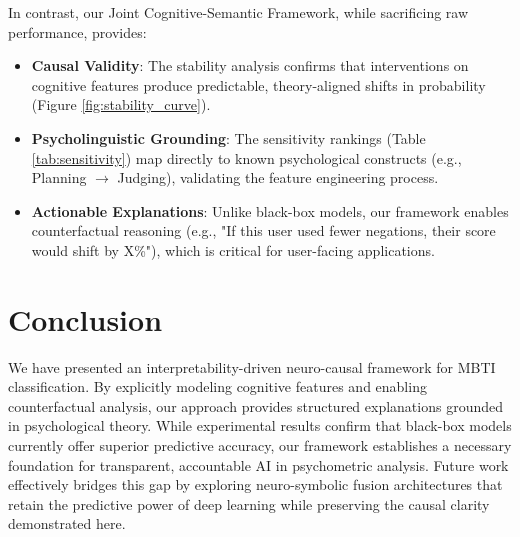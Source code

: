 In contrast, our Joint Cognitive-Semantic Framework, while sacrificing raw performance, provides:
\begin{itemize}
    \item \textbf{Causal Validity}: The stability analysis confirms that interventions on cognitive features produce predictable, theory-aligned shifts in probability (Figure \ref{fig:stability_curve}).
    \item \textbf{Psycholinguistic Grounding}: The sensitivity rankings (Table \ref{tab:sensitivity}) map directly to known psychological constructs (e.g., Planning $\rightarrow$ Judging), validating the feature engineering process.
    \item \textbf{Actionable Explanations}: Unlike black-box models, our framework enables counterfactual reasoning (e.g., "If this user used fewer negations, their score would shift by X\%"), which is critical for user-facing applications.
\end{itemize}

\section{Conclusion}
We have presented an interpretability-driven neuro-causal framework for MBTI classification. By explicitly modeling cognitive features and enabling counterfactual analysis, our approach provides structured explanations grounded in psychological theory. While experimental results confirm that black-box models currently offer superior predictive accuracy, our framework establishes a necessary foundation for transparent, accountable AI in psychometric analysis. Future work effectively bridges this gap by exploring neuro-symbolic fusion architectures that retain the predictive power of deep learning while preserving the causal clarity demonstrated here.